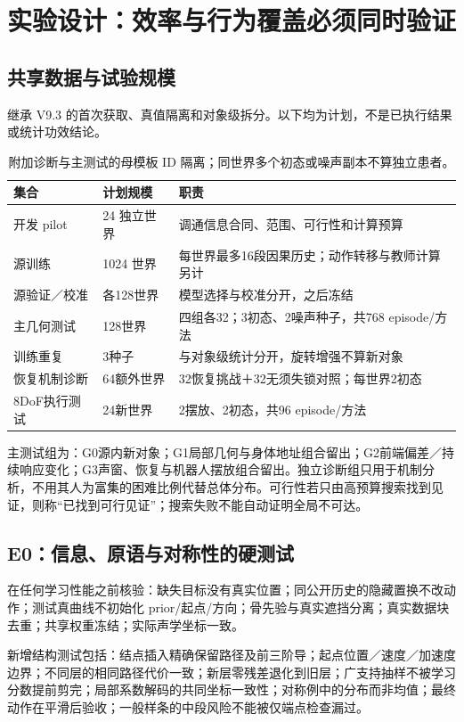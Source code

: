 \documentclass[UTF8,fontset=fandol,11pt,a4paper]{ctexart}
\theoremstyle{plain}
\theoremstyle{definition}
\theoremstyle{remark}
\numberwithin{equation}{section}
\begin{document}
\section{实验设计：效率与行为覆盖必须同时验证}
\label{sec:experiments}
\subsection{共享数据与试验规模}
继承 V9.3 的首次获取、真值隔离和对象级拆分。以下均为计划，不是已执行结果或统计功效结论。
\begin{table}[htbp]\centering\small
\begin{tabularx}{\linewidth}{P{34mm}P{29mm}Y}\toprule
集合 & 计划规模 & 职责\\\midrule
开发 pilot & 24 独立世界 & 调通信息合同、范围、可行性和计算预算\\
源训练 & 1024 世界 & 每世界最多16段因果历史；动作转移与教师计算另计\\
源验证／校准 & 各128世界 & 模型选择与校准分开，之后冻结\\
主几何测试 & 128世界 & 四组各32；3初态、2噪声种子，共768 episode/方法\\
训练重复 & 3种子 & 与对象级统计分开，旋转增强不算新对象\\
恢复机制诊断 & 64额外世界 & 32恢复挑战＋32无须失锁对照；每世界2初态\\
8DoF执行测试 & 24新世界 & 2摆放、2初态，共96 episode/方法\\\bottomrule
\end{tabularx}
\caption{附加诊断与主测试的母模板 ID 隔离；同世界多个初态或噪声副本不算独立患者。}
\end{table}

主测试组为：G0源内新对象；G1局部几何与身体地址组合留出；G2前端偏差／持续响应变化；G3声窗、恢复与机器人摆放组合留出。独立诊断组只用于机制分析，不用其人为富集的困难比例代替总体分布。可行性若只由高预算搜索找到见证，则称“已找到可行见证”；搜索失败不能自动证明全局不可达。

\subsection{E0：信息、原语与对称性的硬测试}
在任何学习性能之前核验：缺失目标没有真实位置；同公开历史的隐藏置换不改动作；测试真曲线不初始化 prior/起点/方向；骨先验与真实遮挡分离；真实数据块去重；共享权重冻结；实际声学坐标一致。

新增结构测试包括：结点插入精确保留路径及前三阶导；起点位置／速度／加速度边界；不同层的相同路径代价一致；新层零残差退化到旧层；广支持抽样不被学习分数提前剪完；局部系数解码的共同坐标一致性；对称例中的分布而非均值；最终动作在平滑后验收；一般样条的中段风险不能被仅端点检查漏过。
\end{document}
